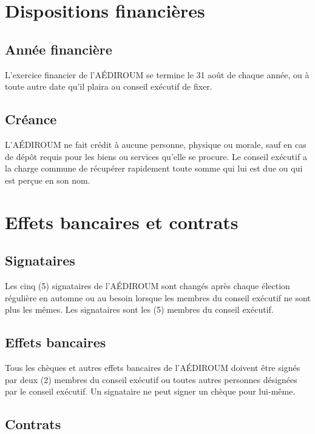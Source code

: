 \documentclass{aediroum}
\begin{document}
\section{Dispositions financières}\label{sec:dispositions-financieres}
\subsection{Année financière}\label{sec:annee-financiere}

L'exercice financier de l'AÉDIROUM se termine le 31 août de chaque année, ou à toute autre date qu'il plaira au conseil exécutif de fixer.

\subsection{Créance}\label{sec:creance}

L'AÉDIROUM ne fait crédit à aucune personne, physique ou morale, sauf en cas de dépôt requis pour les biens ou services qu'elle se procure. Le conseil exécutif a la charge commune de récupérer rapidement toute somme qui lui est due ou qui est perçue en son nom.

\section{Effets bancaires et contrats}\label{sec:effets-bancaires-contrats}
\subsection{Signataires}\label{sec:signataires}
Les cinq (5) signataires de l'AÉDIROUM sont changés après chaque élection régulière en automne ou au besoin lorsque les membres du conseil exécutif ne sont plus les mêmes. Les signataires sont les (5) membres du conseil exécutif.

\subsection{Effets bancaires}\label{sec:effets-bancaires}

Tous les chèques et autres effets bancaires de l'AÉDIROUM doivent être signés par deux (2) membres du conseil exécutif ou toutes autres personnes désignées par le conseil exécutif. Un signataire ne peut signer un chèque pour lui-même.

\subsection{Contrats}\label{sec:contrats}
\end{document}
